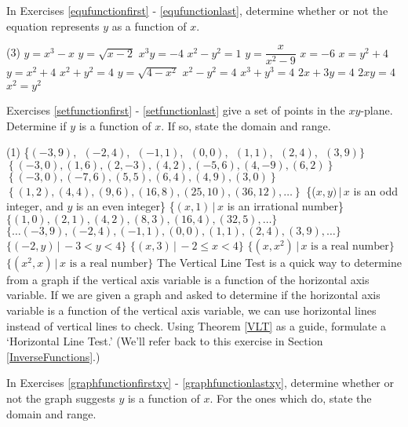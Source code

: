 In Exercises \ref{equfunctionfirst} - \ref{equfunctionlast}, determine whether or not the equation represents $y$ as a function of $x$.  

\begin{tasks}[resume](3)
\task $y = x^{3} - x$ \label{equfunctionfirst}
\task $y = \sqrt{x - 2}$
\task $x^{3}y = -4$ 
\task $x^{2} - y^{2} = 1$
\task $y = \dfrac{x}{x^{2} - 9}$
\task $x = -6$
\task  $x = y^2 + 4$
\task $y = x^2 + 4$
\task $x^2 + y^2 = 4$
\task $y = \sqrt{4-x^2}$
\task $x^2 - y^2 = 4$
\task $x^3 + y^3 = 4$
\task $2x + 3y = 4$
\task $2xy = 4$
\task $x^2 = y^2$ \label{equfunctionlast}
\end{tasks}

Exercises \ref{setfunctionfirst} - \ref{setfunctionlast} give a set of points in the $xy$-plane.    Determine if $y$ is a function of $x$.  If so, state the domain and range.

\begin{tasks}[resume](1)
\task \{$(-3, 9)$, $\;(-2, 4)$, $\;(-1, 1)$, $\;(0, 0)$, $\;(1, 1)$, $\;(2, 4)$, $\;(3, 9)\}$ \label{setfunctionfirst}
\task  $\left\{ (-3,0), (1,6), (2, -3), (4,2), (-5,6), (4, -9), (6,2) \right\}$
\task  $\left\{ (-3,0), (-7,6), (5,5), (6,4), (4,9), (3,0) \right\}$
\task  $\left\{ (1,2), (4,4), (9,6), (16,8), (25,10), (36, 12), \ldots \right\}$
\task \{($x, y) \, | \, x$ is an odd integer, and $y$ is an even integer\}
\task \{$(x, 1) \, | \, x$ is an irrational number\}
\task $\{ (1,0), (2,1), (4,2), (8,3), (16,4), (32, 5), \ldots \}$
\task $\{ \ldots (-3,9), (-2,4), (-1,1), (0,0), (1,1), (2,4), (3,9), \ldots \}$
\task $\{ (-2, y) \, | \, -3 < y < 4\}$
\task  $\{ (x,3) \, | \,  -2 \leq x < 4\}$
\task  $\{ \left(x,x^2\right) \, | \, \text{$x$ is a real number} \}$
\task  $\{ \left(x^2,x\right) \, | \, \text{$x$ is a real number} \}$ \label{setfunctionlast}
\task  \label{HLTExercise} The Vertical Line Test is a quick way to determine from a graph if the vertical axis variable is a function of the horizontal axis variable. If we are given a graph and asked to determine if the horizontal axis variable is a function of the vertical axis variable, we can use horizontal lines instead of vertical lines to check.  Using Theorem \ref{VLT} as a guide,  formulate a `Horizontal Line Test.'  (We'll refer back to this exercise in Section \ref{InverseFunctions}.)
\end{tasks}

In Exercises \ref{graphfunctionfirstxy} - \ref{graphfunctionlastxy}, determine whether or not the graph suggests $y$ is a function of $x$.  For the ones which do, state the domain and range. 

